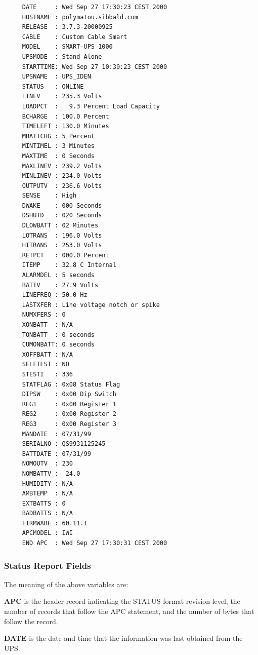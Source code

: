 {{{{{{{{{{{{{{{\begin{verbatim}
     DATE     : Wed Sep 27 17:30:23 CEST 2000
     HOSTNAME : polymatou.sibbald.com
     RELEASE  : 3.7.3-20000925
     CABLE    : Custom Cable Smart
     MODEL    : SMART-UPS 1000
     UPSMODE  : Stand Alone
     STARTTIME: Wed Sep 27 10:39:23 CEST 2000
     UPSNAME  : UPS_IDEN
     STATUS   : ONLINE
     LINEV    : 235.3 Volts
     LOADPCT  :   9.3 Percent Load Capacity
     BCHARGE  : 100.0 Percent
     TIMELEFT : 130.0 Minutes
     MBATTCHG : 5 Percent
     MINTIMEL : 3 Minutes
     MAXTIME  : 0 Seconds
     MAXLINEV : 239.2 Volts
     MINLINEV : 234.0 Volts
     OUTPUTV  : 236.6 Volts
     SENSE    : High
     DWAKE    : 000 Seconds
     DSHUTD   : 020 Seconds
     DLOWBATT : 02 Minutes
     LOTRANS  : 196.0 Volts
     HITRANS  : 253.0 Volts
     RETPCT   : 000.0 Percent
     ITEMP    : 32.8 C Internal
     ALARMDEL : 5 seconds
     BATTV    : 27.9 Volts
     LINEFREQ : 50.0 Hz
     LASTXFER : Line voltage notch or spike
     NUMXFERS : 0
     XONBATT  : N/A
     TONBATT  : 0 seconds
     CUMONBATT: 0 seconds
     XOFFBATT : N/A
     SELFTEST : NO
     STESTI   : 336
     STATFLAG : 0x08 Status Flag
     DIPSW    : 0x00 Dip Switch
     REG1     : 0x00 Register 1
     REG2     : 0x00 Register 2
     REG3     : 0x00 Register 3
     MANDATE  : 07/31/99
     SERIALNO : QS9931125245
     BATTDATE : 07/31/99
     NOMOUTV  : 230
     NOMBATTV :  24.0
     HUMIDITY : N/A
     AMBTEMP  : N/A
     EXTBATTS : 0
     BADBATTS : N/A
     FIRMWARE : 60.11.I
     APCMODEL : IWI
     END APC  : Wed Sep 27 17:30:31 CEST 2000
\end{verbatim}
\normalsize

\label{Status-Report-Fields}

\subsubsection*{Status Report Fields}

\label{index-Status-256}
The meaning of the above variables are:  

\begin{description}

\item {\bf APC}
is the header record indicating the STATUS format revision level, the number
of records that follow the APC statement, and the number of bytes that follow
the record.  

\item {\bf DATE}
is the date and time that the information was last obtained from the UPS.  


\end{description}}}}}}}}}}}}}}}}
